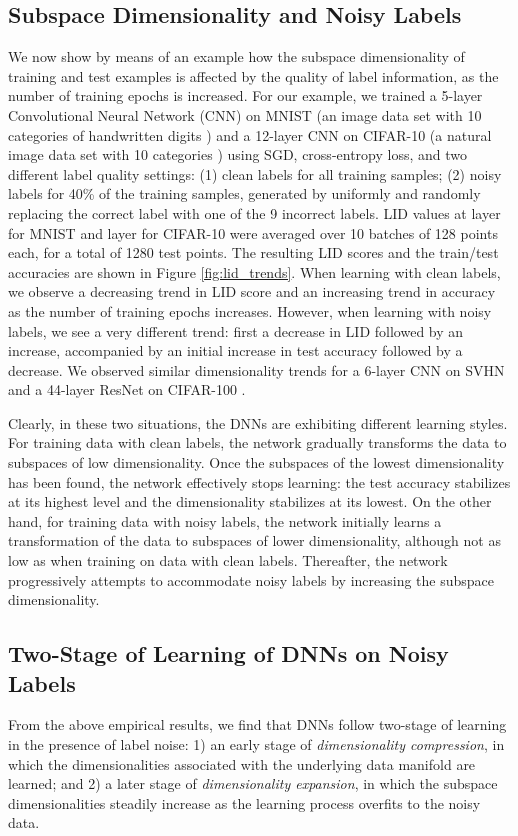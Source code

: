 \documentclass{article}
\begin{document}
\subsection{Subspace Dimensionality and Noisy Labels}\label{sec:subsapce_dimensionality}
We now show by means of an example how the subspace dimensionality of training and test examples is affected by the quality of label information, as the number of training epochs is increased.
For our example, we trained a 5-layer Convolutional Neural Network (CNN) on MNIST (an image data set with 10 categories of handwritten digits \cite{lecun1998gradient}) and a 12-layer CNN on CIFAR-10 (a natural image data set with 10 categories \cite{krizhevsky2009learning}) using SGD, cross-entropy loss, and two different label quality settings: (1) clean labels for all training samples; (2) noisy labels for 40\% of the training samples, generated by uniformly and randomly replacing the correct label with one of the 9 incorrect labels. LID values at layer  for MNIST and layer  for CIFAR-10 were averaged over 10 batches of 128 points each, for a total of 1280 test points. The resulting LID scores and the train/test accuracies are shown in Figure \ref{fig:lid_trends}. When learning with clean labels, we observe a decreasing trend in LID score and an increasing trend in accuracy as the number of training epochs increases. However, when learning with noisy labels, we see a very different trend: first a decrease in LID followed by an increase, accompanied by an initial increase in test accuracy followed by a decrease. We observed similar dimensionality trends for a 6-layer CNN on SVHN \cite{netzer2011reading} and a 44-layer ResNet \cite{he2016deep} on CIFAR-100 \cite{krizhevsky2009learning}.

Clearly, in these two situations, the DNNs are exhibiting different learning styles. For training data with clean labels, the network gradually transforms the data to subspaces of low dimensionality. Once the subspaces of the lowest dimensionality has been found, the network effectively stops learning: the test accuracy stabilizes at its highest level and the dimensionality stabilizes at its lowest. On the other hand, for training data with noisy labels, the network initially learns a transformation of the data to subspaces of lower dimensionality, although not as low as when training on data with clean labels. Thereafter, the network progressively attempts to accommodate noisy labels by increasing the subspace dimensionality. 


\subsection{Two-Stage of Learning of DNNs on Noisy Labels}
From the above empirical results, we find that DNNs follow two-stage of learning in the presence of label noise: 1) an early stage of {\em dimensionality compression}, in which the dimensionalities associated with the underlying data manifold are learned; and 2) a later stage of {\em dimensionality expansion}, in which the subspace dimensionalities steadily increase as the learning process overfits to the noisy data. 
\end{document}
